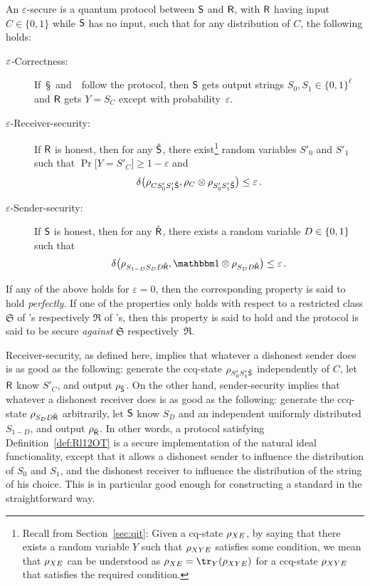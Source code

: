 \begin{definition}[\RandlStringOT] \label{def:Rl12OT}
  An $\varepsilon$-secure {\em \RandlStringOT} is a quantum protocol
  between $\S$ and $\R$, with $\R$ having input $C \in \{0,1\}$ while
  $\S$ has no input, such that for any distribution of $C$, the
  following holds:
\begin{description}
\item[\boldmath$\eps$-Correctness:] If\ \S\ and\ \R\ follow the
  protocol, then $\S$ gets output strings $S_0,S_1 \in \{0,1\}^{\ell}$ and
  $\R$ gets $Y = S_C$ except with probability~$\varepsilon$.
\item[\boldmath$\varepsilon$-Receiver-security:] If $\R$ is honest, then
  for any $\dS$, there exist\footnote{Recall from
    Section~\ref{sec:qit}: Given a cq-state $\rho_{X \regE}$,
    by saying that there exists a random variable $Y$ such that
    $\rho_{XY\regE}$ satisfies some condition, we mean that $\rho_{X
      \regE}$ can be understood as $\rho_{X\regE} =
    \tr_Y(\rho_{XY\regE})$ for a ccq-state $\rho_{XY\regE}$ that
    satisfies the required condition.} random variables $S'_0$ and
  $S'_1$ such that $\Pr\big[Y=S'_C\big] \geq 1-\varepsilon$ and
$$
  \dist{ \rho_{C S'_0 S'_1 \dS} , \rho_C \otimes \rho_{S'_0 S'_1 \dS}
  } \leq \eps \, .
$$
\item[\boldmath$\varepsilon$-Sender-security:] If $\S$ is honest, then for
  any $\dR$, there exists a random variable $D \in \set{0,1}$ such that
$$
  \dist{ \rho_{S_{1-D} S_{D} D \dR} , \id \otimes \rho_{S_{D}
      D \dR} } \leq \eps \, .
$$
\end{description}
If any of the above holds for $\varepsilon = 0$, %
then the corresponding property is said to hold {\em perfectly}. 
If one of the properties only holds with respect to a restricted class
$\mathfrak{S}$ of \dS's respectively $\mathfrak{R}$ of \dR's, then this property
is said to hold and the protocol is said to be secure {\em against}
$\mathfrak{S}$ respectively~$\mathfrak{R}$.
\end{definition}

Receiver-security, as defined here, implies that whatever a dishonest
sender does is as good as the following: generate the ccq-state
$\rho_{S_0' S'_1 \dS}$ independently of $C$, let $\R$ know $S'_C$, and
output $\rho_{\dS}$.  On the other hand, sender-security implies that
whatever a dishonest receiver does is as good as the following:
generate the ccq-state $\rho_{S_{D} D \dR}$ arbitrarily, let $\S$
know $S_{D}$ and an independent uniformly distributed $S_{1-D}$, and
output $\rho_{\dR}$.  In other words, a protocol satisfying
Definition~\ref{def:Rl12OT} is a secure implementation of the natural
\RandlStringOT ideal functionality, except that it allows a dishonest
sender to influence the distribution of $S_0$ and $S_1$, and the
dishonest receiver to influence the distribution of the string of his
choice. This is in particular good enough for constructing a standard
\lStringOT in the straightforward way.

